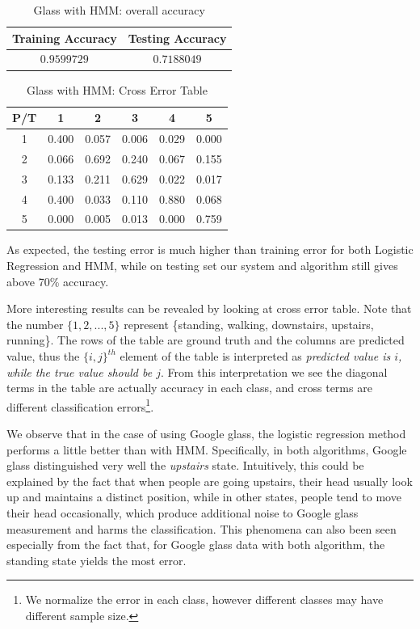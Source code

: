 \begin{table}[!htb]
\begin{center}
\begin{tabular}{c|c}
      \hline
      Training Accuracy & Testing Accuracy\\
      \hline
      $0.9599729$ & $0.7188049$ \\
      \hline
\end{tabular}
\caption{Glass with HMM: overall accuracy}
\label{tab:glassHMM1}
\end{center}
\end{table}
\begin{table}[h]
\begin{center}
\begin{tabular}{c|c|c|c|c|c}
      \hline
      P/T& 1 & 2 &3 & 4 & 5 \\
      \hline
      1 &0.400&0.057&0.006&0.029&0.000\\
      2 &0.066&0.692&0.240&0.067&0.155\\
      3 &0.133&0.211&0.629&0.022&0.017\\
      4 &0.400&0.033&0.110&0.880&0.068\\
      5 & 0.000&0.005&0.013&0.000&0.759\\
      \hline
\end{tabular}
\caption{Glass with HMM: Cross Error Table}
\label{tab:glassHMM2}
\end{center}
\end{table}

As expected, the testing error is much higher than training error for both Logistic Regression and HMM, while on testing set our system and algorithm still gives above 70\% accuracy. 

More interesting results can be revealed by looking at cross error table. Note that the number $\{1,2,...,5\}$ represent \{standing, walking, downstairs, upstairs, running\}. The rows of the table are ground truth and the columns are predicted value, thus the $\{i,j\}^{th}$ element of the table is interpreted as \textit{predicted value is $i$, while the true value should be $j$}. From this interpretation we see the diagonal terms in the table are actually accuracy in each class, and cross terms are different classification errors\footnote{We normalize the error in each class, however different classes may have different sample size.}.

We observe that in the case of using Google glass, the logistic regression method performs a little better than with HMM. Specifically, in both algorithms, Google glass distinguished very well the \textit{upstairs} state. Intuitively, this could be explained by the fact that when people are going upstairs, their head usually look up and maintains a distinct position, while in other states, people tend to move their head occasionally, which produce additional noise to Google glass measurement and harms the classification. This phenomena can also been seen especially from the fact that, for Google glass data with both algorithm, the standing state yields the most error.

